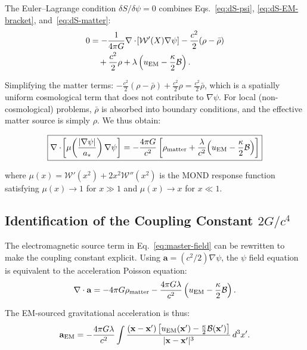 \documentclass[aps,prd,twocolumn,superscriptaddress,floatfix,nofootinbib]{revtex4-2}
\newcommand{\avec}{\mathbf{a}}
\newcommand{\astar}{a_*}
\newcommand{\Wfunc}{\mathcal{W}}
\newcommand{\mufunction}{\mu}
\newcommand{\lam}{\lambda}
\newcommand{\kap}{\kappa}
\newcommand{\calB}{\mathcal{B}}
\begin{document}
The Euler--Lagrange condition $\delta S/\delta\psi = 0$ combines
Eqs.~\eqref{eq:dS-psi}, \eqref{eq:dS-EM-bracket},
and~\eqref{eq:dS-matter}:
\begin{align}
0 &= -\frac{1}{4\pi G}\nabla\cdot\!\left[\Wfunc'(X)\nabla\psi\right]
- \frac{c^2}{2}(\rho - \bar{\rho}) \notag\\
&\quad + \frac{c^2}{2}\rho
+ \lambda\left(u_{\rm EM} - \frac{\kap}{2}\calB\right).
\end{align}

Simplifying the matter terms: $-\frac{c^2}{2}(\rho - \bar{\rho})
+ \frac{c^2}{2}\rho = \frac{c^2}{2}\bar{\rho}$, which is a spatially
uniform cosmological term that does not contribute to $\nabla\psi$.
For local (non-cosmological) problems, $\bar{\rho}$ is absorbed
into boundary conditions, and the effective matter source is simply
$\rho$. We thus obtain:

\begin{equation}
\boxed{
\nabla\cdot\!\left[\mufunction\!\left(
\frac{|\nabla\psi|}{\astar}\right)\nabla\psi\right]
= -\frac{4\pi G}{c^2}\left[
  \rho_{\rm matter}
  + \frac{\lam}{c^2}\!\left(u_{\rm EM}
  - \frac{\kap}{2}\calB\right)
\right]
}
\label{eq:master-field}
\end{equation}

where $\mufunction(x) = \Wfunc'(x^2) + 2x^2\Wfunc''(x^2)$ is the
MOND response function satisfying $\mufunction(x) \to 1$ for $x \gg 1$
and $\mufunction(x) \to x$ for $x \ll 1$.

\subsection{Identification of the Coupling Constant $2G/c^4$}
\label{sec:coupling-constant}

The electromagnetic source term in Eq.~\eqref{eq:master-field} can be
rewritten to make the coupling constant explicit. Using
$\avec = (c^2/2)\nabla\psi$, the $\psi$ field equation is equivalent
to the acceleration Poisson equation:
\begin{equation}
\nabla\cdot\avec = -4\pi G\rho_{\rm matter}
- \frac{4\pi G\lam}{c^2}\left(u_{\rm EM}
- \frac{\kap}{2}\calB\right).
\end{equation}

The EM-sourced gravitational acceleration is thus:
\begin{equation}
\avec_{\rm EM} = -\frac{4\pi G\lam}{c^2}\int
\frac{(\mathbf{x}-\mathbf{x}')\left[u_{\rm EM}(\mathbf{x}')
- \frac{\kap}{2}\calB(\mathbf{x}')\right]}
{|\mathbf{x}-\mathbf{x}'|^3}\,d^3x'.
\end{equation}
\end{document}
